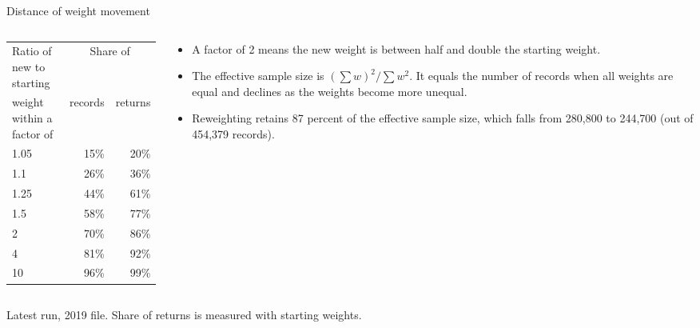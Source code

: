 \documentclass[11pt,aspectratio=169]{beamer}
\newcommand{\slidenote}[1]{\par\vfill{\scriptsize\color{yalegrey}#1}}
\begin{document}
\begin{frame}{Distance of weight movement}
  \begin{columns}[T]
    \begin{column}{0.48\textwidth}
      \centering
      \small
      \begin{tabular}{@{}lrr@{}}
        \toprule
        Ratio of new to starting & \multicolumn{2}{c}{Share of} \\
        weight within a factor of & records & returns \\
        \midrule
        1.05 & 15\% & 20\% \\
        1.1  & 26\% & 36\% \\
        1.25 & 44\% & 61\% \\
        1.5  & 58\% & 77\% \\
        2    & 70\% & 86\% \\
        4    & 81\% & 92\% \\
        10   & 96\% & 99\% \\
        \bottomrule
      \end{tabular}
    \end{column}
    \begin{column}{0.48\textwidth}
      \small
      \begin{itemize}
        \item A factor of 2 means the new weight is between half and double the starting weight.
        \vspace{0.4em}
        \item The effective sample size is $(\sum w)^2 / \sum w^2$. It equals the number of records
              when all weights are equal and declines as the weights become more unequal.
        \vspace{0.4em}
        \item Reweighting retains 87 percent of the effective sample size, which falls from
              280,800 to 244,700 (out of 454,379 records).
      \end{itemize}
    \end{column}
  \end{columns}
  \slidenote{Latest run, 2019 file. Share of returns is measured with starting weights.}
\end{frame}

\end{document}
